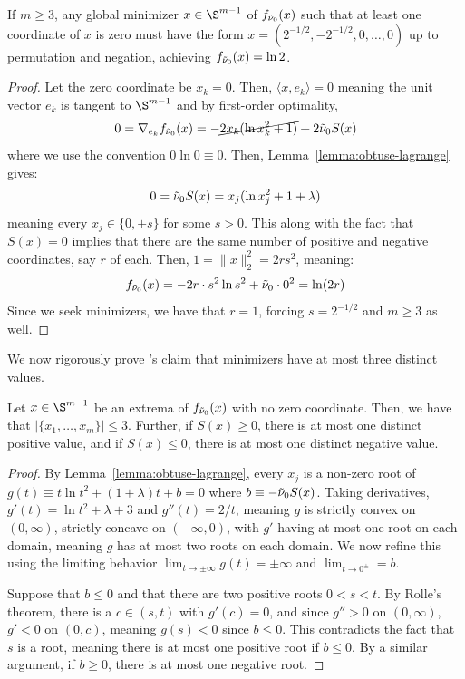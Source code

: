\documentclass[11pt]{article}
\begin{document}
\begin{lemma}\label{lemma:obtuse-zero}
   If $m\geq 3$, any global minimizer $x\in \S^{m-1}$ of $f_{{\Tilde \nu_0}}(x)$ such that at least one coordinate of $x$ is zero must have the form $x=(2^{-1/2},-2^{-1/2},0,\dots,0)$ up to permutation and negation, achieving $f_{{\Tilde \nu_0}}(x)=\ln 2 $. 
\end{lemma}
\begin{proof}
    Let the zero coordinate be $x_k=0$. Then, $\langle x,e_k\rangle=0$ meaning the unit vector $e_k$ is tangent to $\S^{m-1}$ and by first-order optimality, 
    \begin{equation}
        0=\nabla_{e_k}f_{{\Tilde \nu_0}}(x)=-\cancel{2x_k (\ln x_k^2 +1)}+2{\Tilde \nu_0} S(x)
    \end{equation}
    where we use the convention $0\ln 0\equiv 0$. Then, Lemma~\ref{lemma:obtuse-lagrange} gives:
    \begin{equation}
        0={\Tilde \nu_0} S(x)=x_j(\ln x_j^2 + 1+\lambda)
    \end{equation}
    meaning every $x_j\in \{0,\pm s\}$ for some $s>0$. This along with the fact that $S(x)=0$ implies that there are the same number of positive and negative coordinates, say $r$ of each. Then, $1=\|x\|_2^2=2rs^2$, meaning:
    \begin{equation}
        f_{{\Tilde \nu_0}}(x)=-2r\cdot s^2\ln s^2 +{\Tilde \nu_0} \cdot 0^2 =\ln(2r)
    \end{equation}
    Since we seek minimizers, we have that $r=1$, forcing $s=2^{-1/2}$ and $m\geq 3 $ as well. 
\end{proof}

We now rigorously prove \citep{holevo2025quantum}'s claim that minimizers have at most three distinct values. 
\begin{lemma}\label{lemma:obtuse-three}
   Let $x\in \S^{m-1}$ be an extrema of $f_{{\Tilde \nu_0}}(x)$ with no zero coordinate. Then, we have that $|\{x_1,\dots,x_m\}|\leq 3$. Further, if $S(x)\geq 0$, there is at most one distinct positive value, and if $S(x)\leq 0$, there is at most one distinct negative value. 
\end{lemma}
\begin{proof}
    By Lemma~\ref{lemma:obtuse-lagrange}, every $x_j$ is a non-zero root of $g(t)\equiv t\ln t^2 + (1+\lambda )t +b=0$ where $b\equiv -{\Tilde \nu_0}S(x)$. Taking derivatives, $g'(t)=\ln t^2 +\lambda+3$ and $g''(t)=2/t$, meaning $g$ is strictly convex on $(0,\infty)$, strictly concave on $(-\infty,0)$, with $g'$ having at most one root on each domain, meaning $g$ has at most two roots on each domain. We now refine this using the limiting behavior $\lim_{t\to \pm \infty}g(t)=\pm \infty$ and $\lim_{t\to 0^\pm}=b$. 

    Suppose that $b\leq 0$ and that there are two positive roots $0<s<t$. By Rolle's theorem, there is a $c\in (s,t)$ with $g'(c)=0$, and since $g''>0$ on $(0,\infty)$, $g'<0$ on $(0,c)$, meaning $g(s)<0$ since $b\leq 0$. This contradicts the fact that $s$ is a root, meaning there is at most one positive root if $b\leq 0$. By a similar argument, if $b\geq 0$, there is at most one negative root. 
\end{proof}
\end{document}
